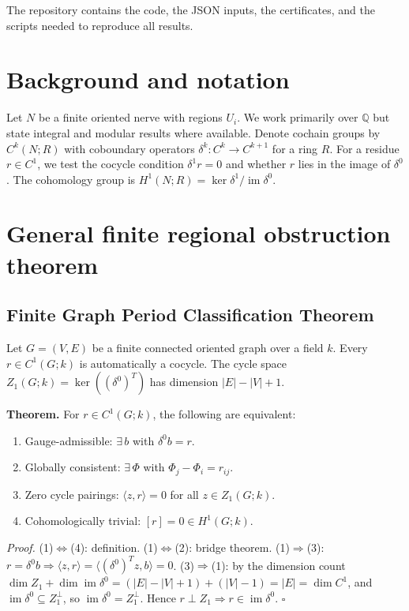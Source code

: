 \documentclass[11pt]{article}
\begin{document}
The repository contains the code, the JSON inputs, the certificates, and the
scripts needed to reproduce all results.

\section{Background and notation}
Let $N$ be a finite oriented nerve with regions $U_i$. We work primarily over
$\mathbb{Q}$ but state integral and modular results where available.
Denote cochain groups by $C^k(N;R)$ with coboundary operators
$\delta^k:C^k\to C^{k+1}$ for a ring $R$. For a residue $r\in C^1$, we test the cocycle
condition $\delta^1 r = 0$ and whether $r$ lies in the image of $\delta^0$.
The cohomology group is $H^1(N;R) = \ker\delta^1/\operatorname{im}\delta^0$.

\section{General finite regional obstruction theorem}\label{sec:general}

\subsection*{Finite Graph Period Classification Theorem}

Let $G=(V,E)$ be a finite connected oriented graph over a field $k$. Every
$r\in C^1(G;k)$ is automatically a cocycle. The cycle space
$Z_1(G;k)=\ker((\delta^0)^T)$ has dimension $|E|-|V|+1$.

\textbf{Theorem.}\label{thm:general}
For $r\in C^1(G;k)$, the following are equivalent:
\begin{enumerate}
\item Gauge-admissible: $\exists\,b$ with $\delta^0 b=r$.
\item Globally consistent: $\exists\,\Phi$ with $\Phi_j-\Phi_i=r_{ij}$.
\item Zero cycle pairings: $\langle z,r\rangle=0$ for all $z\in Z_1(G;k)$.
\item Cohomologically trivial: $[r]=0\in H^1(G;k)$.
\end{enumerate}

\textit{Proof.}
(1)$\Leftrightarrow$(4): definition. (1)$\Leftrightarrow$(2): bridge theorem.
(1)$\Rightarrow$(3): $r=\delta^0 b\Rightarrow\langle z,r\rangle=\langle(\delta^0)^Tz,b\rangle=0$.
(3)$\Rightarrow$(1): by the dimension count $\dim Z_1+\dim\operatorname{im}\delta^0
= (|E|-|V|+1)+(|V|-1)=|E|=\dim C^1$, and $\operatorname{im}\delta^0\subseteq Z_1^\perp$,
so $\operatorname{im}\delta^0=Z_1^\perp$. Hence $r\perp Z_1\Rightarrow r\in\operatorname{im}\delta^0$.
$\square$
\end{document}
